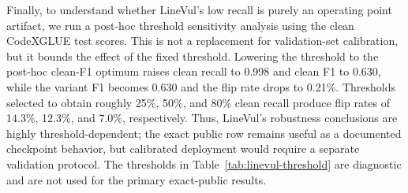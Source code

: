 \documentclass[a4paper,fleqn]{cas-dc}
\begin{document}
\begin{table}[t]
  \centering
  \caption{Exact-public aggregation and selective-prediction diagnostics.}
  \label{tab:public-aggregation}
\end{table}

Finally, to understand whether LineVul's low recall is purely an operating
point artifact, we run a post-hoc threshold sensitivity analysis using the
clean CodeXGLUE test scores. This is not a replacement for validation-set
calibration, but it bounds the effect of the fixed threshold. Lowering the
threshold to the post-hoc clean-F1 optimum raises clean recall to 0.998 and
clean F1 to 0.630, while the variant F1 becomes 0.630 and the flip rate drops
to 0.21\%. Thresholds selected to obtain roughly 25\%, 50\%, and 80\% clean
recall produce flip rates of 14.3\%, 12.3\%, and 7.0\%, respectively. Thus,
LineVul's robustness conclusions are highly threshold-dependent; the exact
public row remains useful as a documented checkpoint behavior, but calibrated
deployment would require a separate validation protocol.
The thresholds in Table~\ref{tab:linevul-threshold} are diagnostic and are not
used for the primary exact-public results.
\end{document}
